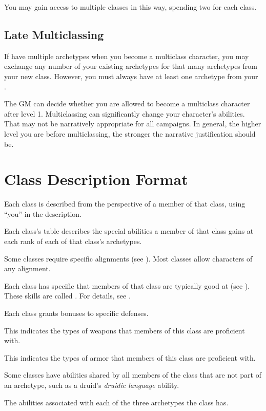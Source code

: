     You may gain access to multiple classes in this way, spending two  for each class.

  \subsection{Late Multiclassing}
    If have multiple archetypes when you become a multiclass character, you may exchange any number of your existing archetypes for that many archetypes from your new class.
    However, you must always have at least one archetype from your .

    The GM can decide whether you are allowed to become a multiclass character after level 1.
    Multiclassing can significantly change your character's abilities.
    That may not be narratively appropriate for all campaigns.
    In general, the higher level you are before multiclassing, the stronger the narrative justification should be.

\section{Class Description Format}
  Each class is described from the perspective of a member of that class, using ``you'' in the description.

  Each class's table describes the special abilities a member of that class gains at each rank of each of that class's archetypes.

  Some classes require specific alignments (see ).
  Most classes allow characters of any alignment.

  Each class has specific  that members of that class are typically good at (see ).
  These skills are called .
  For details, see .

  Each class grants bonuses to specific defenses.

  This indicates the types of weapons that members of this class are proficient with.

  This indicates the types of armor that members of this class are proficient with.

  Some classes have abilities shared by all members of the class that are not part of an archetype, such as a druid's \textit{druidic language} ability.

  The abilities associated with each of the three archetypes the class has.

  
